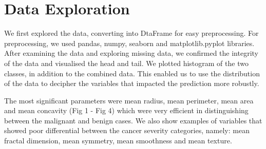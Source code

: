 \documentclass[conference]{IEEEtran}
\begin{document}
\section{Data Exploration}
We first explored the data, converting into DtaFrame for easy preprocessing. For preprocessing, we used pandas, numpy, seaborn and matplotlib.pyplot libraries. After examining the data and exploring missing data, we confirmed the integrity of the data and visualised the head and tail. We plotted histogram of the two classes, in addition to the combined data. This enabled us to use the distribution of the data to decipher the variables that impacted the prediction more robustly.

The most significant parameters were mean radius, mean perimeter, mean area and mean concavity (Fig 1 - Fig 4) which were very efficient in distinguishing between the malignant and benign cases. We also show examples of variables that showed poor differential between the cancer severity categories, namely: mean fractal dimension, mean symmetry, mean smoothness and mean texture.
\end{document}
